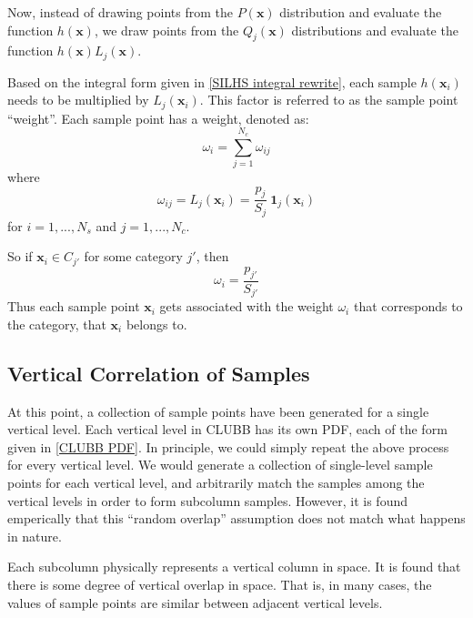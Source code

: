 \documentclass[11pt,fleqn]{article}
\begin{document}
Now, instead of drawing points from the $P(\mathbf{x})$ distribution and
evaluate the function $h(\mathbf{x})$, we draw points from the $Q_j(\mathbf{x})$
distributions and evaluate the function $h(\mathbf{x}) L_j(\mathbf{x})$.

Based on the integral form given in \eqref{SILHS integral rewrite}, each sample
$h(\mathbf{x}_i)$ needs to be multiplied by $L_j(\mathbf{x}_i)$. This factor is
referred to as the sample point ``weight''. Each sample point has a weight,
denoted as:
\begin{equation}
 \omega_{i} = \sum\limits_{j=1}^{N_c} \omega_{ij}
\end{equation}
where
\begin{equation}
\omega_{ij} = L_j(\mathbf{x}_i) = \frac{p_j}{S_j}\ \mathbf{1}_j(\mathbf{x}_i) 
\label{SILHS importance weights def}
\end{equation}
for $i=1,...,N_s$ and $j=1,...,N_c$.

So if $\mathbf{x}_i \in C_{j'}$ for some category $j'$, then
\begin{equation}
 \omega_{i} = \frac{p_{j'}}{S_{j'}}
\end{equation}
Thus each sample point $\mathbf{x}_i$ gets associated with the weight $\omega_i$ that corresponds to the category, that $\mathbf{x}_i$ belongs to.

\subsection{Vertical Correlation of Samples}

At this point, a collection of sample points have been generated for a single
vertical level. Each vertical level in CLUBB has its own PDF, each of the form
given in \eqref{CLUBB PDF}. In principle, we could simply repeat the above
process for every vertical level. We would generate a collection of single-level
sample points for each vertical level, and arbitrarily match the samples among
the vertical levels in order to form subcolumn samples. However, it is found
emperically that this ``random overlap'' assumption does not match what happens
in nature.

Each subcolumn physically represents a vertical column in space. It is found
that there is some degree of vertical overlap in space. That is, in many cases,
the values of sample points are similar between adjacent vertical levels.
\end{document}

